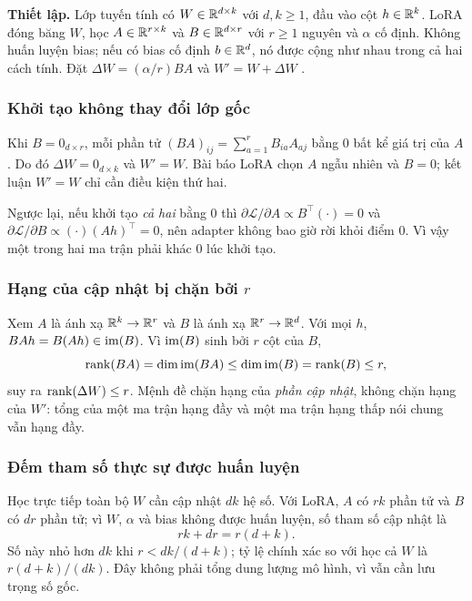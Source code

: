 \textbf{Thiết lập.} Lớp tuyến tính có $W\in\mathbb{R}^{d\times k}$ với $d,k\ge1$, đầu vào
cột $h\in\mathbb{R}^k$. LoRA đóng băng $W$, học $A\in\mathbb{R}^{r\times k}$ và $B\in\mathbb{R}^{d\times r}$
với $r\ge1$ nguyên và $\alpha$ cố định. Không huấn luyện bias; nếu có bias cố định
$b\in\mathbb{R}^d$, nó được cộng như nhau trong cả hai cách tính. Đặt
$\Delta W=(\alpha/r)BA$ và $W'=W+\Delta W$ \cite[§4.1--4.2]{lora}.

\subsubsection{Khởi tạo không thay đổi lớp gốc}

Khi $B=0_{d\times r}$, mỗi phần tử $(BA)_{ij}=\sum_{a=1}^{r}B_{ia}A_{aj}$ bằng $0$
bất kể giá trị của $A$. Do đó $\Delta W=0_{d\times k}$ và $W'=W$. Bài báo LoRA chọn
$A$ ngẫu nhiên và $B=0$; kết luận $W'=W$ chỉ cần điều kiện thứ hai.

Ngược lại, nếu khởi tạo \emph{cả hai} bằng $0$ thì
$\partial\mathcal L/\partial A\propto B^\top(\cdot)=0$ và
$\partial\mathcal L/\partial B\propto(\cdot)(Ah)^\top=0$, nên adapter không bao giờ
rời khỏi điểm $0$. Vì vậy một trong hai ma trận phải khác $0$ lúc khởi tạo.

\subsubsection{Hạng của cập nhật bị chặn bởi $r$}

Xem $A$ là ánh xạ $\mathbb{R}^k\to\mathbb{R}^r$ và $B$ là ánh xạ $\mathbb{R}^r\to\mathbb{R}^d$. Với mọi $h$,
$BAh=B(Ah)\in\operatorname{im}(B)$. Vì $\operatorname{im}(B)$ sinh bởi $r$ cột của $B$,
\[
  \operatorname{rank}(BA)=\dim\operatorname{im}(BA)\le\dim\operatorname{im}(B)=\operatorname{rank}(B)\le r,
\]
suy ra $\operatorname{rank}(\Delta W)\le r$. Mệnh đề chặn hạng của \emph{phần cập nhật}, không
chặn hạng của $W'$: tổng của một ma trận hạng đầy và một ma trận hạng thấp nói
chung vẫn hạng đầy.

\subsubsection{Đếm tham số thực sự được huấn luyện}

Học trực tiếp toàn bộ $W$ cần cập nhật $dk$ hệ số. Với LoRA, $A$ có $rk$ phần tử và
$B$ có $dr$ phần tử; vì $W$, $\alpha$ và bias không được huấn luyện, số tham số cập
nhật là
\begin{equation}
  rk+dr=r(d+k).
  \label{eq:b4-count}
\end{equation}
Số này nhỏ hơn $dk$ khi $r<dk/(d+k)$; tỷ lệ chính xác so với học cả $W$ là
$r(d+k)/(dk)$. Đây không phải tổng dung lượng mô hình, vì vẫn cần lưu trọng số gốc.


